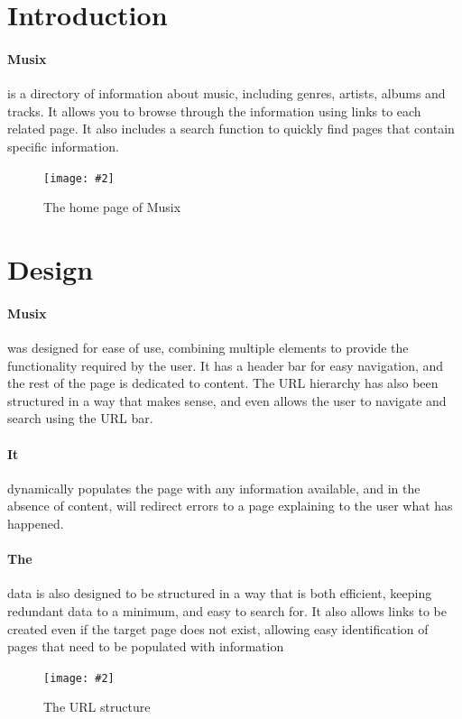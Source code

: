 \documentclass[10pt, a4paper]{article}
\title{\mytitle}
\author{\myauthor\hspace{1em}\\\contact\\Edinburgh Napier University\hspace{0.5em}-\hspace{0.5em}\mymodule}
\date{}
\newcommand{\figuremacro}[5]{
    \begin{figure}[#1]
        \centering
        \texttt{[image: \#2]}
        \caption[#3]{\textbf{#3}#4}
        \label{fig:#2}
    \end{figure}
}
\begin{document}
    \maketitle
    
    \section{Introduction}
    \paragraph{Musix} is a directory of information about music, including genres, artists, albums and tracks. It allows you to browse through the information using links to each related page. It also includes a search function to quickly find pages that contain specific information.
    
    \figuremacro{h}{images/main.png}{}{The home page of Musix}{1.0}
    
    \section{Design}
    \paragraph{Musix} was designed for ease of use, combining multiple elements to provide the functionality required by the user. It has a header bar for easy navigation, and the rest of the page is dedicated to content. The URL hierarchy has also been structured in a way that makes sense, and even allows the user to navigate and search using the URL bar.
    \paragraph{It} dynamically populates the page with any information available, and in the absence of content, will redirect errors to a page explaining to the user what has happened.
    \paragraph{The} data is also designed to be structured in a way that is both efficient, keeping redundant data to a minimum, and easy to search for. It also allows links to be created even if the target page does not exist, allowing easy identification of pages that need to be populated with information
    
    \figuremacro{H}{images/URL.png}{}{The URL structure}{1.0}
    
\end{document}
